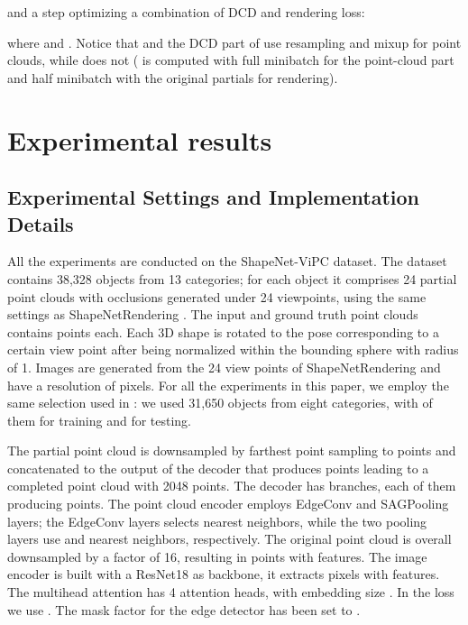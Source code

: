 \documentclass{article}
\begin{document}
and a step optimizing a combination of DCD and rendering loss:

where  and . Notice that  and the DCD part of  use resampling and mixup for point clouds, while  does not ( is computed with full minibatch for the point-cloud part and half minibatch with the original partials for rendering).







\section{Experimental results}\label{sec:exp}

\subsection{Experimental Settings and Implementation Details}

All the experiments are conducted on the ShapeNet-ViPC\cite{vipc} dataset.
The dataset contains 38,328 objects from 13 categories; for each object it comprises 24 partial point clouds with occlusions generated under 24 viewpoints, using the same settings as ShapeNetRendering \cite{chang2015shapenet}. The input and ground truth point clouds contains  points each.
Each 3D shape is rotated to the pose corresponding to a certain view point after being normalized within the bounding sphere with radius of 1. Images are generated from the 24 view points of ShapeNetRendering and have a resolution of  pixels. For all the experiments in this paper, we employ the same selection used in \cite{vipc}: we used 31,650 objects from eight categories, with  of them for training and  for testing.

The partial point cloud is downsampled by farthest point sampling to  points and concatenated to the output of the decoder that produces  points leading to a completed point cloud with 2048 points. The decoder has  branches, each of them producing  points. 
The point cloud encoder employs EdgeConv and SAGPooling layers; the EdgeConv layers selects  nearest neighbors, while the two pooling layers use  and  nearest neighbors, respectively. The original point cloud is overall downsampled by a factor of 16, resulting in  points with  features.
The image encoder is built with a ResNet18 \cite{resnet} as backbone, it extracts  pixels with  features. The multihead attention has 4 attention heads, with embedding size . In the  loss we use . The mask factor for the edge detector has been set to .
\end{document}
